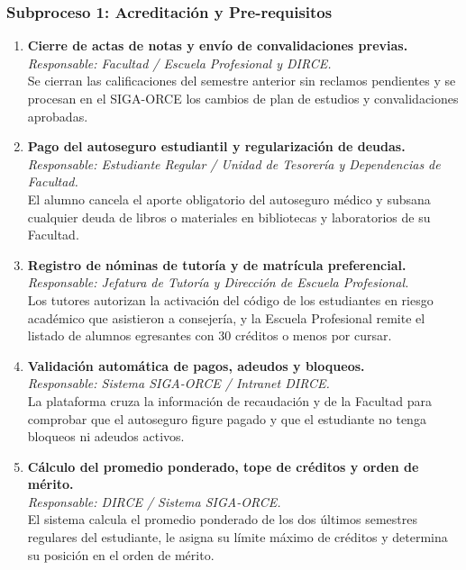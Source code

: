 \subsubsection{Subproceso 1: Acreditación y Pre-requisitos}

\begin{enumerate}
    \item \textbf{Cierre de actas de notas y envío de convalidaciones previas.} \\
    \textit{Responsable: Facultad / Escuela Profesional y DIRCE.} \\
    Se cierran las calificaciones del semestre anterior sin reclamos pendientes y se procesan en el SIGA-ORCE los cambios de plan de estudios y convalidaciones aprobadas.

    \item \textbf{Pago del autoseguro estudiantil y regularización de deudas.} \\
    \textit{Responsable: Estudiante Regular / Unidad de Tesorería y Dependencias de Facultad.} \\
    El alumno cancela el aporte obligatorio del autoseguro médico y subsana cualquier deuda de libros o materiales en bibliotecas y laboratorios de su Facultad.

    \item \textbf{Registro de nóminas de tutoría y de matrícula preferencial.} \\
    \textit{Responsable: Jefatura de Tutoría y Dirección de Escuela Profesional.} \\
    Los tutores autorizan la activación del código de los estudiantes en riesgo académico que asistieron a consejería, y la Escuela Profesional remite el listado de alumnos egresantes con 30 créditos o menos por cursar.

    \item \textbf{Validación automática de pagos, adeudos y bloqueos.} \\
    \textit{Responsable: Sistema SIGA-ORCE / Intranet DIRCE.} \\
    La plataforma cruza la información de recaudación y de la Facultad para comprobar que el autoseguro figure pagado y que el estudiante no tenga bloqueos ni adeudos activos.

    \item \textbf{Cálculo del promedio ponderado, tope de créditos y orden de mérito.} \\
    \textit{Responsable: DIRCE / Sistema SIGA-ORCE.} \\
    El sistema calcula el promedio ponderado de los dos últimos semestres regulares del estudiante, le asigna su límite máximo de créditos y determina su posición en el orden de mérito.


\end{enumerate}
